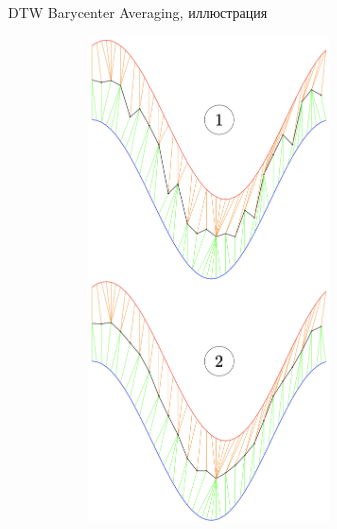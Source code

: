 \begin{frame}{DTW Barycenter Averaging, иллюстрация}
\hfill
\begin{figure}[H]
\centering
     \begin{subfigure}[t]{0.45\textwidth}
         \includegraphics[width=0.7\textwidth]{lecture_7/figs/DBA_1_2.png}
     \end{subfigure}
     \begin{subfigure}[t]{0.45\textwidth}

\end{subfigure}
\end{figure}
\end{frame}
